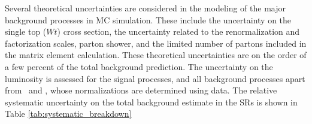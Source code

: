 Several theoretical uncertainties are considered in the modeling of the major
background processes in MC simulation. These include the uncertainty on the
single top ($Wt$) cross section, the uncertainty related to the renormalization
and factorization scales, parton shower, and the limited number of partons
included in the matrix element calculation. These theoretical uncertainties
are on the order of a few percent of the total background prediction. The
uncertainty on the luminosity is assessed for the signal processes, and all
background processes apart from \TTBAR\ and \ZGAMMAJETS, whose
normalizations are determined using data.
The relative systematic uncertainty on the total background estimate in the
SRs is shown in Table \ref{tab:systematic_breakdown}

\begin{table}[ht]
\caption{Summary of the effect of each considered sources of systematic
  uncertainty on the background estimate in SR~400 and SR~600. Several
  sources of theoretical systematic uncertainty which have a small
  effect on the total background estimate are grouped into the
  ``Other theory'' category.
}
\label{tab:systematic_breakdown}
%
\end{table}

